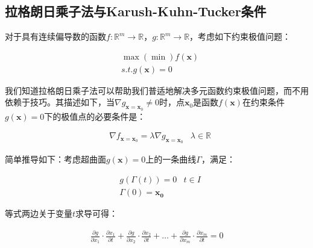 \documentclass[UTF8]{book}
\begin{document}
\subsection{拉格朗日乘子法与Karush-Kuhn-Tucker条件}
对于具有连续偏导数的函数$f:\mathbb{R}^m \rightarrow \mathbb{R}$，$g:\mathbb{R}^m \rightarrow \mathbb{R}$，考虑如下约束极值问题：
\begin{large}
    \begin{equation}
        \begin{aligned}
           &\max(\min)f(\mathbf{x}) \\
           &s.t. g(\mathbf{x})=0
           \nonumber
        \end{aligned}
    \end{equation}
\end{large}
我们知道拉格朗日乘子法可以帮助我们普适地解决多元函数约束极值问题，而不用依赖于技巧。其描述如下，当$\nabla g_{\mathbf{x}=\mathbf{x}_0}\not = 0$时，点$\mathbf{x}_0$是函数$f(\mathbf{x})$在约束条件$g(\mathbf{x})=0$下的极值点的必要条件是：
\begin{large}
    \begin{equation}
        \begin{aligned}
            &\nabla f_{\mathbf{x}=\mathbf{x}_0}=\lambda \nabla g_{\mathbf{x}=\mathbf{x}_0}& \lambda \in \mathbb{R}
            \nonumber
        \end{aligned}
    \end{equation}
\end{large}
简单推导如下：考虑超曲面$g(\mathbf{x})=0$上的一条曲线$\Gamma$，满足：
\begin{large}
    \begin{equation}
        \begin{aligned}
            &g\left (\Gamma(t)\right )=0& t \in I \\
            &\Gamma(0)=\mathbf{x_0}
            \nonumber
        \end{aligned}
    \end{equation}
\end{large}
等式两边关于变量$t$求导可得：
\begin{large}
    \begin{equation}
        \begin{aligned}
            \frac{\partial g}{\partial x_1} \cdot \frac{\partial x_1}{\partial t}+\frac{\partial g}{\partial x_2} \cdot \frac{\partial x_2}{\partial t}+\dots+\frac{\partial g}{\partial x_m} \cdot \frac{\partial x_m}{\partial t}=0
            \nonumber
        \end{aligned}
    \end{equation}
\end{large}
\end{document}
